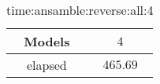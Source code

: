 \begin{table}[!ht]
	\centering
	\begin{tabular}{|c|c|}
		\hline
		Models & $4$ \\ \hline
		elapsed & $465.69$ \\ \hline
	\end{tabular}
	\caption{time:ansamble:reverse:all:4}
	\label{tab:time:ansamble:reverse:all:4}
\end{table}
